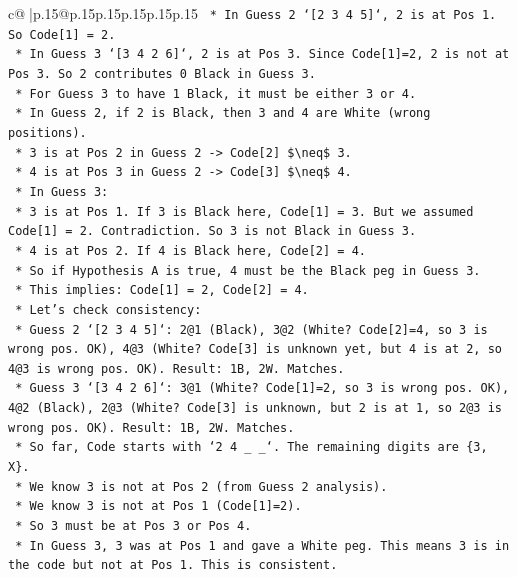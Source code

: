\documentclass{article}
\begin{document}
{\begin{supertabular}{c@{$\;$}|p{.15\linewidth}@{}p{.15\linewidth}p{.15\linewidth}p{.15\linewidth}p{.15\linewidth}p{.15\linewidth}}
{{{\texttt{    *   In Guess 2 `{[}2 3 4 5{]}`, 2 is at Pos 1. So Code{[}1{]} = 2.} \\
\texttt{    *   In Guess 3 `{[}3 4 2 6{]}`, 2 is at Pos 3. Since Code{[}1{]}=2, 2 is not at Pos 3. So 2 contributes 0 Black in Guess 3.} \\
\texttt{    *   For Guess 3 to have 1 Black, it must be either 3 or 4.} \\
\texttt{    *   In Guess 2, if 2 is Black, then 3 and 4 are White (wrong positions).} \\
\texttt{        *   3 is at Pos 2 in Guess 2 {-}> Code{[}2{]} \$\textbackslash{}neq\$ 3.} \\
\texttt{        *   4 is at Pos 3 in Guess 2 {-}> Code{[}3{]} \$\textbackslash{}neq\$ 4.} \\
\texttt{    *   In Guess 3:} \\
\texttt{        *   3 is at Pos 1. If 3 is Black here, Code{[}1{]} = 3. But we assumed Code{[}1{]} = 2. Contradiction. So 3 is not Black in Guess 3.} \\
\texttt{        *   4 is at Pos 2. If 4 is Black here, Code{[}2{]} = 4.} \\
\texttt{        *   So if Hypothesis A is true, 4 must be the Black peg in Guess 3.} \\
\texttt{        *   This implies: Code{[}1{]} = 2, Code{[}2{]} = 4.} \\
\texttt{        *   Let's check consistency:} \\
\texttt{            *   Guess 2 `{[}2 3 4 5{]}`: 2@1 (Black), 3@2 (White? Code{[}2{]}=4, so 3 is wrong pos. OK), 4@3 (White? Code{[}3{]} is unknown yet, but 4 is at 2, so 4@3 is wrong pos. OK). Result: 1B, 2W. Matches.} \\
\texttt{            *   Guess 3 `{[}3 4 2 6{]}`: 3@1 (White? Code{[}1{]}=2, so 3 is wrong pos. OK), 4@2 (Black), 2@3 (White? Code{[}3{]} is unknown, but 2 is at 1, so 2@3 is wrong pos. OK). Result: 1B, 2W. Matches.} \\
\texttt{    *   So far, Code starts with `2 4 \_ \_`. The remaining digits are \{3, X\}.} \\
\texttt{    *   We know 3 is not at Pos 2 (from Guess 2 analysis).} \\
\texttt{    *   We know 3 is not at Pos 1 (Code{[}1{]}=2).} \\
\texttt{    *   So 3 must be at Pos 3 or Pos 4.} \\
\texttt{    *   In Guess 3, 3 was at Pos 1 and gave a White peg. This means 3 is in the code but not at Pos 1. This is consistent.} \\
}}}
\end{supertabular}}
\end{document}
